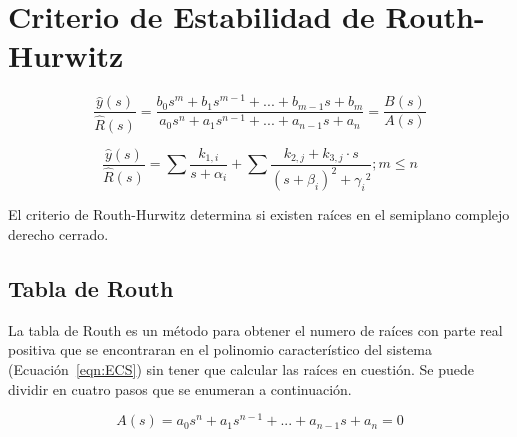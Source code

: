 \section{Criterio de Estabilidad de Routh-Hurwitz}

    \begin{equation}
        \frac{\hat{y}(s)}{\hat{R}(s)} = \frac{b_0 s^m + b_1 s^{m-1} + ... + b_{m-1} s + b_m}{a_0 s^n + a_1 s^{n-1} + ... + a_{n-1} s + a_n} = \frac{B(s)}{A(s)}
    \end{equation}

    \begin{equation}
        \frac{\hat{y}(s)}{\hat{R}(s)} = \sum{\frac{k_{1,i}}{s + \alpha_i}} + \sum{\frac{k_{2,j} + k_{3,j} \cdot s}{(s + \beta_i)^2 + {\gamma_i}^2}} ; m \leq n
    \end{equation}

    El criterio de Routh-Hurwitz determina si existen raíces en el semiplano complejo derecho cerrado.

    \subsection{Tabla de Routh}
        La tabla de Routh es un método para obtener el numero de raíces con parte real positiva que se encontraran en el polinomio característico del sistema (Ecuación~\ref{eqn:ECS}) sin tener que calcular las raíces en cuestión. Se puede dividir en cuatro pasos que se enumeran a continuación.

        \begin{equation} \label{eqn:ECS}
            A(s) = a_0 s^n + a_1 s^{n-1} + ... + a_{n-1} s + a_n = 0
        \end{equation}

